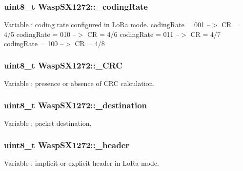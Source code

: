 \subsubsection[{\texorpdfstring{\+\_\+coding\+Rate}{_codingRate}}]{\setlength{\rightskip}{0pt plus 5cm}uint8\+\_\+t Wasp\+S\+X1272\+::\+\_\+coding\+Rate}\hypertarget{class_wasp_s_x1272_a82c8def66933dc82a7125ebccc757a22}{}\label{class_wasp_s_x1272_a82c8def66933dc82a7125ebccc757a22}
Variable \+: coding rate configured in Lo\+Ra mode. coding\+Rate = 001 --$>$ CR = 4/5 coding\+Rate = 010 --$>$ CR = 4/6 coding\+Rate = 011 --$>$ CR = 4/7 coding\+Rate = 100 --$>$ CR = 4/8 
\subsubsection[{\texorpdfstring{\+\_\+\+C\+RC}{_CRC}}]{\setlength{\rightskip}{0pt plus 5cm}uint8\+\_\+t Wasp\+S\+X1272\+::\+\_\+\+C\+RC}\hypertarget{class_wasp_s_x1272_ab53671db53fec5cf5972a540db517024}{}\label{class_wasp_s_x1272_ab53671db53fec5cf5972a540db517024}
Variable \+: presence or absence of C\+RC calculation. 
\subsubsection[{\texorpdfstring{\+\_\+destination}{_destination}}]{\setlength{\rightskip}{0pt plus 5cm}uint8\+\_\+t Wasp\+S\+X1272\+::\+\_\+destination}\hypertarget{class_wasp_s_x1272_a85c9daae64a5291ea033aab2c9eb4c80}{}\label{class_wasp_s_x1272_a85c9daae64a5291ea033aab2c9eb4c80}
Variable \+: packet destination. 
\subsubsection[{\texorpdfstring{\+\_\+header}{_header}}]{\setlength{\rightskip}{0pt plus 5cm}uint8\+\_\+t Wasp\+S\+X1272\+::\+\_\+header}\hypertarget{class_wasp_s_x1272_ab63346ffc568865de30c4638a4ed43f9}{}\label{class_wasp_s_x1272_ab63346ffc568865de30c4638a4ed43f9}
Variable \+: implicit or explicit header in Lo\+Ra mode. 
